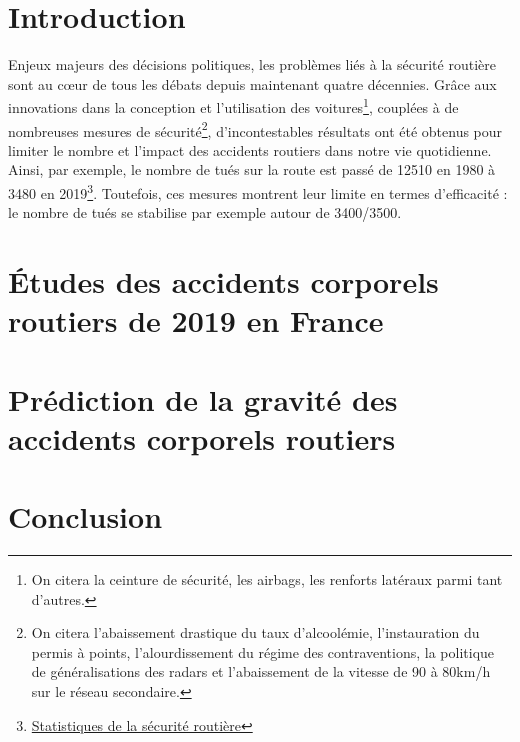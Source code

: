 \documentclass[french,]{tp}
\let\rmarkdownfootnote\footnote%
\def\footnote{\protect\rmarkdownfootnote}
\begin{document}
\newpage

\hypertarget{introduction}{%
\section{Introduction}\label{introduction}}

Enjeux majeurs des décisions politiques, les problèmes liés à la sécurité routière sont au cœur de tous les débats depuis maintenant quatre décennies.
Grâce aux innovations dans la conception et l'utilisation des voitures\footnote{On citera la ceinture de sécurité, les airbags, les renforts latéraux parmi tant d'autres.}, couplées à de nombreuses mesures de sécurité\footnote{On citera l'abaissement drastique du taux d'alcoolémie, l'instauration du permis à points, l'alourdissement du régime des contraventions, la politique de généralisations des radars et l'abaissement de la vitesse de 90 à 80km/h sur le réseau secondaire.}, d'incontestables résultats ont été obtenus pour limiter le nombre et l'impact des accidents routiers dans notre vie quotidienne. Ainsi, par exemple, le nombre de tués sur la route est passé de 12510 en 1980 à 3480 en 2019\footnote{\href{http://www.securite-routiere.org/Fiches/statistiques/statfr.htm}{Statistiques de la sécurité routière}}. Toutefois, ces mesures montrent leur limite en termes d'efficacité : le nombre de tués se stabilise par exemple autour de 3400/3500.

\hypertarget{uxe9tudes-des-accidents-corporels-routiers-de-2019-en-france}{%
\section{Études des accidents corporels routiers de 2019 en France}\label{uxe9tudes-des-accidents-corporels-routiers-de-2019-en-france}}

\hypertarget{pruxe9diction-de-la-gravituxe9-des-accidents-corporels-routiers}{%
\section{Prédiction de la gravité des accidents corporels routiers}\label{pruxe9diction-de-la-gravituxe9-des-accidents-corporels-routiers}}

\newpage

\hypertarget{conclusion}{%
\section{Conclusion}\label{conclusion}}
\end{document}
